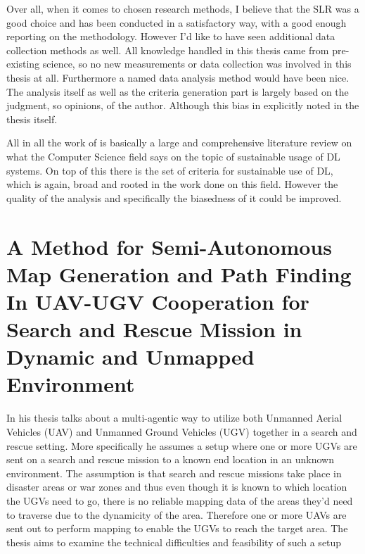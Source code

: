 \documentclass{article}
\begin{document}
	\par Over all, when it comes to chosen research methods, I believe that 
the SLR was a good choice and has been conducted in a satisfactory way, with a 
good enough reporting on the methodology. However I'd like to have seen 
additional data collection methods as well. All knowledge handled in this 
thesis came from pre-existing science, so no new measurements or data 
collection was involved in this thesis at all. Furthermore a named data 
analysis method would have been nice. The analysis itself as well as the 
criteria generation part is largely based on the judgment, so opinions, of the 
author. Although this bias in explicitly noted in the thesis itself.\parencite{T1}
	\par All in all the work of \textcite{T1} is basically a large and 
comprehensive literature review on what the Computer Science field says on the 
topic of sustainable usage of DL systems. On top of this there is the set of 
criteria for sustainable use of DL, which is again, broad and rooted in the 
work done on this field. However the quality of the analysis and specifically 
the biasedness of it could be improved.

\newpage
\section{A Method for Semi-Autonomous Map Generation and Path Finding In UAV-UGV Cooperation for Search and Rescue Mission in Dynamic and Unmapped Environment}


In his thesis \textcite{T2} talks about a multi-agentic way to utilize both 
Unmanned Aerial Vehicles (UAV) and Unmanned Ground Vehicles (UGV) together in 
a search and rescue setting. More specifically he assumes a setup where one or 
more UGVs are sent on a search and rescue mission to a known end location in an 
unknown environment. The assumption is that search and rescue missions take 
place in disaster areas or war zones and thus even though it is known to which 
location the UGVs need to go, there is no reliable mapping data of the areas 
they'd need to traverse due to the dynamicity of the area. Therefore one or 
more UAVs are sent out to perform mapping to enable the UGVs to reach the 
target area. The thesis aims to examine the technical difficulties and 
feasibility of such a setup
\end{document}
